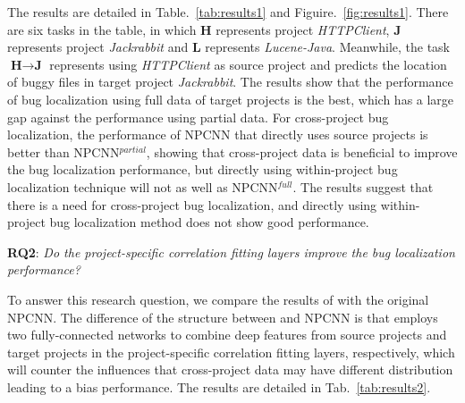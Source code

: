 The results are detailed in Table.~\ref{tab:results1} and Figuire.~\ref{fig:results1}. There are six tasks in the table, in which $\textbf{H}$ represents project \textit{HTTPClient}, $\textbf{J}$ represents project \textit{Jackrabbit} and $\textbf{L}$ represents \textit{Lucene-Java}. Meanwhile, the task $\textbf{H} \rightarrow \textbf{J}$ represents using \textit{HTTPClient} as source project and predicts the location of buggy files in target project \textit{Jackrabbit}. The results show that the performance of bug localization using full data of target projects is the best, which has a large gap against the performance using partial data. For cross-project bug localization, the performance of NPCNN that directly uses source projects is better than NPCNN$^{partial}$, showing that cross-project data is beneficial to improve the bug localization performance, but directly using within-project bug localization technique will not as well as NPCNN$^{full}$. The results suggest that there is a need for cross-project bug localization, and directly using within-project bug localization method does not show good performance.

\textbf{RQ2}: \textit{Do the project-specific correlation fitting layers improve the bug localization performance?}

To answer this research question, we compare the results of \TRANPCNN with the original NPCNN. The difference of the structure between \TRANPCNN and NPCNN is that \TRANPCNN employs two fully-connected networks to combine deep features from source projects and target projects in the project-specific correlation fitting layers, respectively, which will counter the influences that cross-project data may have different distribution leading to a bias performance. The results are detailed in Tab.~\ref{tab:results2}.


